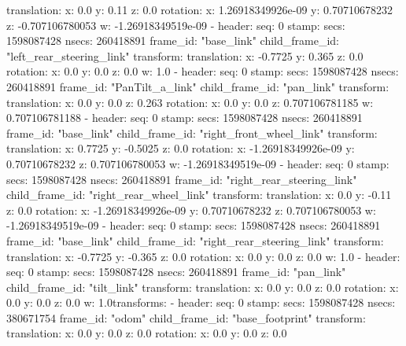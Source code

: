       translation: 
        x: 0.0
        y: 0.11
        z: 0.0
      rotation: 
        x: 1.26918349926e-09
        y: 0.70710678232
        z: -0.707106780053
        w: -1.26918349519e-09
  - 
    header: 
      seq: 0
      stamp: 
        secs: 1598087428
        nsecs: 260418891
      frame_id: "base_link"
    child_frame_id: "left_rear_steering_link"
    transform: 
      translation: 
        x: -0.7725
        y: 0.365
        z: 0.0
      rotation: 
        x: 0.0
        y: 0.0
        z: 0.0
        w: 1.0
  - 
    header: 
      seq: 0
      stamp: 
        secs: 1598087428
        nsecs: 260418891
      frame_id: "PanTilt_a_link"
    child_frame_id: "pan_link"
    transform: 
      translation: 
        x: 0.0
        y: 0.0
        z: 0.263
      rotation: 
        x: 0.0
        y: 0.0
        z: 0.707106781185
        w: 0.707106781188
  - 
    header: 
      seq: 0
      stamp: 
        secs: 1598087428
        nsecs: 260418891
      frame_id: "base_link"
    child_frame_id: "right_front_wheel_link"
    transform: 
      translation: 
        x: 0.7725
        y: -0.5025
        z: 0.0
      rotation: 
        x: -1.26918349926e-09
        y: 0.70710678232
        z: 0.707106780053
        w: -1.26918349519e-09
  - 
    header: 
      seq: 0
      stamp: 
        secs: 1598087428
        nsecs: 260418891
      frame_id: "right_rear_steering_link"
    child_frame_id: "right_rear_wheel_link"
    transform: 
      translation: 
        x: 0.0
        y: -0.11
        z: 0.0
      rotation: 
        x: -1.26918349926e-09
        y: 0.70710678232
        z: 0.707106780053
        w: -1.26918349519e-09
  - 
    header: 
      seq: 0
      stamp: 
        secs: 1598087428
        nsecs: 260418891
      frame_id: "base_link"
    child_frame_id: "right_rear_steering_link"
    transform: 
      translation: 
        x: -0.7725
        y: -0.365
        z: 0.0
      rotation: 
        x: 0.0
        y: 0.0
        z: 0.0
        w: 1.0
  - 
    header: 
      seq: 0
      stamp: 
        secs: 1598087428
        nsecs: 260418891
      frame_id: "pan_link"
    child_frame_id: "tilt_link"
    transform: 
      translation: 
        x: 0.0
        y: 0.0
        z: 0.0
      rotation: 
        x: 0.0
        y: 0.0
        z: 0.0
        w: 1.0transforms: 
  - 
    header: 
      seq: 0
      stamp: 
        secs: 1598087428
        nsecs: 380671754
      frame_id: "odom"
    child_frame_id: "base_footprint"
    transform: 
      translation: 
        x: 0.0
        y: 0.0
        z: 0.0
      rotation: 
        x: 0.0
        y: 0.0
        z: 0.0
